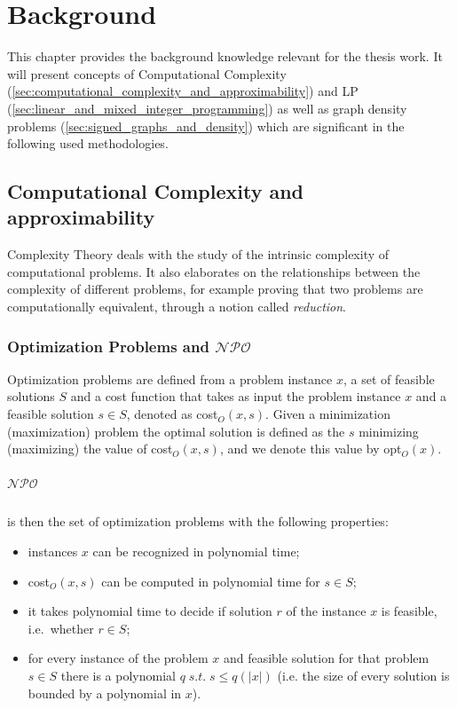 \chapter{Background}
\label{ch:background}

This chapter provides the background knowledge relevant for the thesis work. It
will present concepts of Computational Complexity
(\autoref{sec:computational_complexity_and_approximability}) and \acrlong{LP}
(\autoref{sec:linear_and_mixed_integer_programming}) as well as graph density problems (\autoref{sec:signed_graphs_and_density}) which are significant in the
following used methodologies.

\section{Computational Complexity and \\approximability}%
\label{sec:computational_complexity_and_approximability}

Complexity Theory deals with the study of the intrinsic complexity of
computational problems. It also elaborates on the relationships between
the complexity of different problems, for example proving that two problems are
computationally equivalent\cite{9780521884730}, through a notion called
\emph{reduction}.

\subsection{Optimization Problems and $\mathcal{NPO} $}%
\label{sub:optimization_problems}

Optimization problems are defined from a problem instance $x$, a set of
feasible solutions $S$ and a cost function that takes as input the problem
instance $x$ and a feasible solution $s \in S$, denoted as cost$_{O} (x, s) $.
Given a minimization (maximization) problem the optimal solution is defined as
the $s$ minimizing (maximizing) the value of cost$_{O} (x, s)$, and we denote
this value by opt$_{O} (x) $\cite{Trevisan2004}.

\paragraph{$\mathcal{NPO} $}%
\label{par:_npo_}

is then the set of optimization problems with the following properties:
\begin{itemize}
	\item instances $x$ can be recognized in polynomial time;
	\item cost$_{O} (x, s)$ can be computed in polynomial time for $s \in S$;
	\item it takes polynomial time to decide if solution $r$ of the instance
	      $x$ is feasible, i.e.\ whether $r \in S$;
	\item for every instance of the problem $x$
	      and feasible solution for that problem $s \in S$ there is a
	      polynomial $q \; s.t.  \; s \leq q(|x|)$ (i.e. the size of every
	      solution is bounded by a polynomial in $x$).
\end{itemize}

